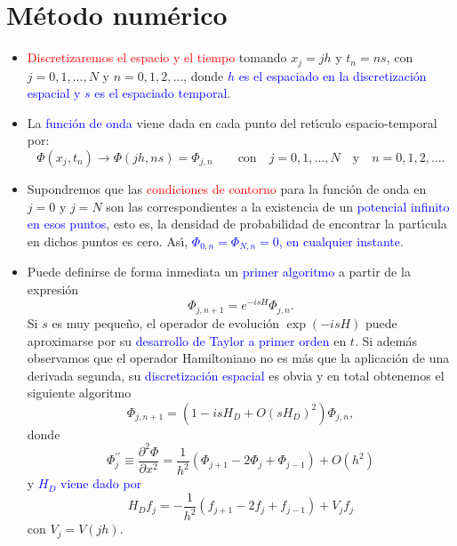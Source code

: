 \documentclass[12pt,spanish]{iopart}
\def\az{\textcolor{blue}}
\def\ro{\textcolor{red}}
\begin{document}
\section{M{\'e}todo num{\'e}rico}

\begin{itemize}

\item \ro{Discretizaremos el espacio y el tiempo} tomando
$x_j=jh$ y $t_n=ns$, con $j=0,1,...,N$ y  $n=0,1,2,...$,
donde  \az{$h$ es el espaciado en la discretizaci\'on espacial y $s$ es el
espaciado temporal}. 

\item La \az{funci\'on de onda} viene dada en cada punto del
ret\'{\i}culo espacio-temporal por:
\begin{equation}
\Phi(x_j,t_n)\rightarrow\Phi(jh,ns)=\Phi_{j,n}\quad\quad \text{con}\quad
j=0,1,...,N \quad \text{y} \quad  n=0,1,2,... .
\end{equation}

\item Supondremos que las \ro{condiciones de contorno} para la funci{\'o}n de onda en $j=0$ y $j=N$ son las correspondientes
a la existencia de un \az{potencial infinito en esos puntos}, esto es, la densidad
de  probabilidad de encontrar la part{\'\i}cula en dichos puntos es cero.
As\'{\i}, \az{$\Phi_{0,n}=\Phi_{N,n}=0$, en cualquier instante}. 

\item Puede definirse de forma inmediata un \az{primer algoritmo} a partir de la expresi{\'o}n 
%
\begin{equation}
\Phi_{j,n+1}= e^{-i s H}\Phi_{j,n}.
\end{equation}
%
Si $s$ es muy peque{\~n}o, el operador de evoluci{\'o}n $\exp{(-isH)}$ 
puede aproximarse por su \az{desarrollo de Taylor a primer orden} en $t$. Si adem{\'a}s observamos
que el operador Hamiltoniano no es m{\'a}s que la aplicaci{\'o}n de una derivada segunda, su \az{discretizaci{\'o}n espacial} es
obvia y en total obtenemos el siguiente algoritmo
%
\begin{equation}
\Phi_{j,n+1}=\left(1-isH_D+O(sH_D)^2\right)\Phi_{j,n},
\end{equation}
%
donde 
%
\begin{equation}
\Phi_j^{\prime\prime}\equiv \frac{\partial^2 \Phi}{\partial x^2}=\frac{1}{h^2}(\Phi_{j+1}-2\Phi_j+\Phi_{j-1})+O(h^2)
\end{equation}
%
y \az{$H_D$ viene dado por}
%
\begin{equation}
H_D f_j=- \frac{1}{h^2}(f_{j+1}-2f_j+f_{j-1})+V_jf_j
\end{equation}
%
con $V_j=V(jh)$. 


\end{itemize}
\end{document}
